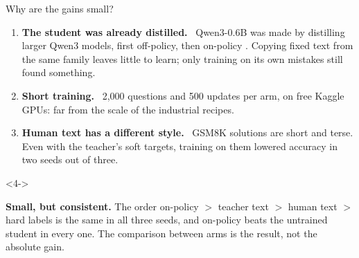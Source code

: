 \begin{frame}{Why are the gains small?\hfill{}}
  \small
  \begin{enumerate}
    \item<1-> \textbf{The student was already distilled.} \est\ Qwen3-0.6B was made by
          distilling larger Qwen3 models, first off-policy, then on-policy
          . Copying fixed text from the same family leaves
          little to learn; only training on its own mistakes still found something.
    \item<2-> \textbf{Short training.} \ours\ 2,000 questions and 500 updates per arm, on
          free Kaggle GPUs: far from the scale of the industrial recipes.
    \item<3-> \textbf{Human text has a different style.} \ours\ GSM8K solutions are short
          and terse. Even with the teacher's soft targets, training on them lowered
          accuracy in two seeds out of three.
  \end{enumerate}
  \vspace{0.2cm}
  \begin{uncoverenv}<4->
  \begin{keybox}
    \footnotesize \textbf{Small, but consistent.} The order on-policy $>$ teacher text $>$
    human text $>$ hard labels is the same in all three seeds, and on-policy beats the
    untrained student in every one. The comparison between arms is the result, not the
    absolute gain.
  \end{keybox}
  \end{uncoverenv}
\end{frame}

